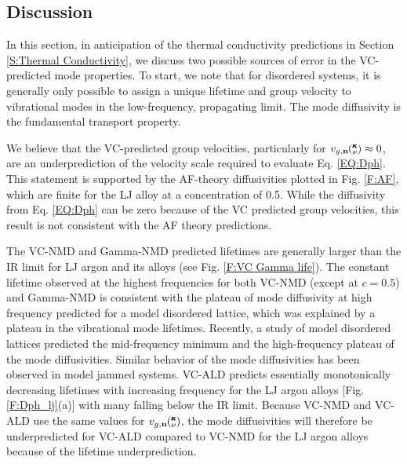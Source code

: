 \documentclass[12pt,twocolumn,iop]{/usr/share/texmf/tex/latex/iop/iopart}[/usr/share/texmf/tex/latex/iop/]
\newcommand{\kv}{\mspace{-4.0mu}\left(\mspace{-8.0mu}
\begin{smallmatrix}&\pmb{\kappa} \\&\nu\end{smallmatrix}
\mspace{-3.0mu}\right)}
\begin{document}
\clearpage

\subsection{\label{S:Discussion}Discussion}

In this section, in anticipation of the thermal conductivity predictions 
in Section \ref{S:Thermal Conductivity}, we discuss two possible sources 
of error in the VC-predicted mode properties. 
To start, we note that for disordered systems, it is generally only 
possible to assign a 
unique lifetime and group velocity to vibrational modes  
in the low-frequency, propagating limit.
\cite{feldman_numerical_1999,xu_energy_2009} The mode diffusivity 
is the fundamental transport property.
\cite{allen_thermal_1993,feldman_thermal_1993,feldman_numerical_1999} 

We believe that the VC-predicted group velocities, particularly 
for $v_{g,\mathbf{n}}\kv \approx 0$, are an underprediction of the 
velocity scale required to evaluate Eq. \eqref{EQ:Dph}.  
This statement is supported by the 
AF-theory diffusivities plotted in Fig. \ref{F:AF}, 
which are finite for the LJ alloy at a concentration 
of 0.5. While the diffusivity from Eq. \eqref{EQ:Dph} can be 
zero because of the VC predicted group velocities, this result is not 
consistent with the AF theory predictions.

The VC-NMD and Gamma-NMD predicted lifetimes are generally larger 
than the IR limit  
for LJ argon and its alloys (see Fig. \ref{F:VC Gamma life}). 
The constant lifetime observed at the highest frequencies  
for both VC-NMD (except at $c=0.5$) and Gamma-NMD is 
consistent with the plateau of mode diffusivity at high 
frequency predicted for a model disordered lattice, 
which was explained by a plateau in the vibrational mode lifetimes.
\cite{sheng_heat_1991} Recently, a study of model disordered lattices 
predicted the mid-frequency minimum and the high-frequency plateau  
of the mode diffusivities.\cite{beltukov_ioffe_2013} Similar 
behavior of the mode diffusivities has been observed in model 
jammed systems.\cite{xu_energy_2009,vitelli_heat_2010} 
VC-ALD predicts essentially monotonically 
decreasing lifetimes with increasing frequency for the LJ argon 
alloys [Fig. \ref{F:Dph_lj}(a)] with many falling below the IR limit. 
Because VC-NMD and VC-ALD use the same values for 
$v_{g,\mathbf{n}}\kv$, the 
mode diffusivities will therefore be underpredicted for 
VC-ALD compared to VC-NMD for the LJ argon alloys because of the 
lifetime underprediction. 
\end{document}
